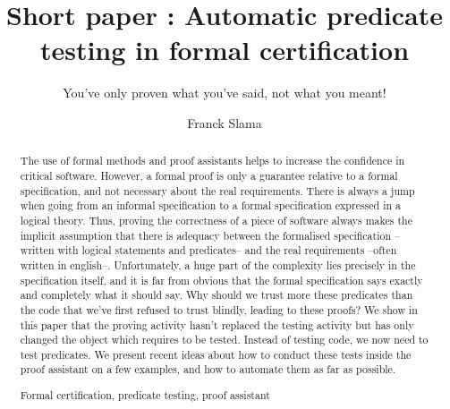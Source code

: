 \documentclass[runningheads,a4paper]{llncs}
\newcommand{\keywords}[1]{\par\addvspace\baselineskip
\noindent\keywordname\enspace\ignorespaces#1}
\begin{document}
\mainmatter  %

\title{Short paper : Automatic predicate testing in formal certification}
\subtitle{You've only proven what you've said, not what you meant!}



\author{Franck Slama\\
         }


\maketitle


\begin{abstract}
The use of formal methods and proof assistants helps to increase the confidence in critical software. However, a formal proof is only a guarantee relative to a formal specification, and not necessary about the real requirements. There is always a jump when going from an informal specification to a formal specification expressed in a logical theory. Thus, proving the correctness of a piece of software always makes the implicit assumption that there is adequacy between the formalised specification --written with logical statements and predicates-- and the real requirements --often written in english--. Unfortunately, a huge part of the complexity lies precisely in the specification itself, and it is far from obvious that the formal specification says exactly and completely what it should say. Why should we trust more these predicates than the code that we've first refused to trust blindly, leading to these proofs? We show in this paper that the proving activity hasn't replaced the testing activity but has only changed the object which requires to be tested. Instead of testing code, we now need to test predicates. We present recent ideas about how to conduct these tests inside the proof assistant on a few examples, and how to automate them as far as possible.

\keywords{Formal certification, predicate testing, proof assistant}
\end{abstract}




















\end{document}
